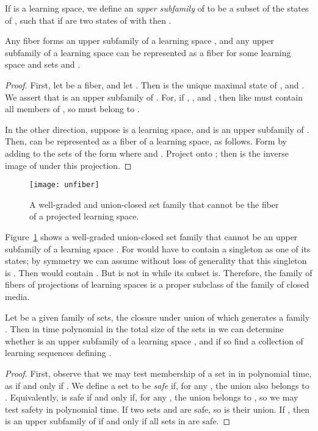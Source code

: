 \documentclass[11pt]{llncs}
\begin{document}
{If  is a learning space, we define an \emph{upper subfamily}  of  to be a subset of the states of , such that if  are two states of  with  then .

\begin{theorem}
Any fiber  forms an upper subfamily of a learning space ,
and any upper subfamily  of a learning space  can be represented as a fiber  for some learning space  and sets  and .
\end{theorem}

\begin{proof}
First, let  be a fiber, and let . Then  is the unique maximal
state of , and . We assert that  is an upper subfamily of . For, if , , and ,
then  like  must contain all members of , so  must belong to .

In the other direction, suppose  is a learning space, and  is an upper subfamily of . Then,  can be represented as a fiber of a learning space, as follows. Form  by adding to  the sets of the form  where  and .
Project  onto ; then  is the inverse image of  under this projection.
\end{proof}

\begin{figure}[t]
\centering\texttt{[image: unfiber]}
\caption{A well-graded and union-closed set family that cannot be the fiber of a projected learning space.}
\label{fig:unfiber}
\end{figure}

Figure~\ref{fig:unfiber} shows a well-graded union-closed set family  that cannot be an upper subfamily  of a learning space . For  would have to contain a singleton as one of its states; by symmetry we can assume without loss of generality that this singleton is . Then  would contain . But  is not in  while its subset  is. Therefore, the family of fibers of projections of learning spaces is a proper subclass of the family of closed media.

\begin{theorem}
Let  be a given family of sets, the closure under union of which generates a family .
Then in time polynomial in the total size of the sets in  we can determine whether  is an upper subfamily  of a learning space , and if so find a collection of learning sequences defining .
\end{theorem}

\begin{proof}
First, observe that we may test membership of a set  in  in polynomial time, as  if and only if . We define a set  to be \emph{safe}
if, for any , the union  also belongs to . Equivalently,  is safe if and only if, for any , the union  belongs to , so we may test safety in polynomial time.
If two sets  and  are safe, so is their union. If , then  is an upper subfamily of  if and only if all sets in  are safe.
 

\end{proof}}
\end{document}
